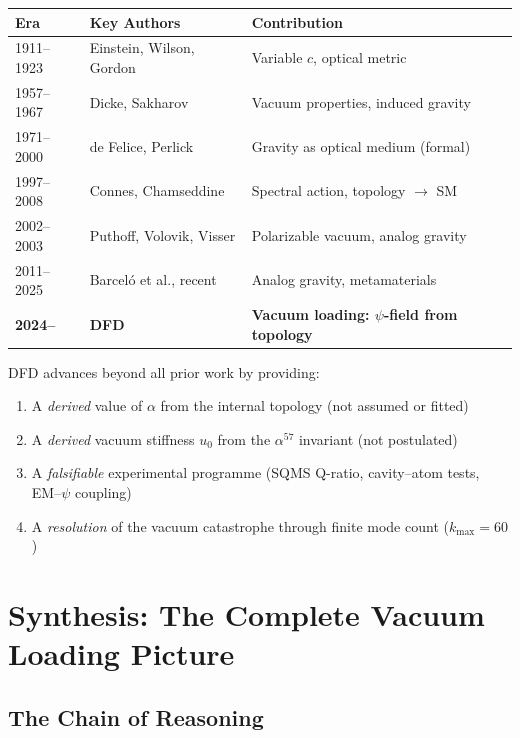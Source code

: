 \documentclass[11pt]{article}
\theoremstyle{plain}
\theoremstyle{definition}
\theoremstyle{remark}
\begin{document}
\begin{center}
\begin{tabular}{lll}
\toprule
\textbf{Era} & \textbf{Key Authors} & \textbf{Contribution} \\
\midrule
1911--1923 & Einstein, Wilson, Gordon & Variable $c$, optical metric \\
1957--1967 & Dicke, Sakharov & Vacuum properties, induced gravity \\
1971--2000 & de Felice, Perlick & Gravity as optical medium (formal) \\
1997--2008 & Connes, Chamseddine & Spectral action, topology $\to$ SM \\
2002--2003 & Puthoff, Volovik, Visser & Polarizable vacuum, analog gravity \\
2011--2025 & Barcel\'{o} et al., recent & Analog gravity, metamaterials \\
\textbf{2024--} & \textbf{DFD} & \textbf{Vacuum loading: $\psi$-field from topology} \\
\bottomrule
\end{tabular}
\end{center}

DFD advances beyond all prior work by providing:
\begin{enumerate}
\item A \emph{derived} value of $\alpha$ from the internal topology
(not assumed or fitted)
\item A \emph{derived} vacuum stiffness $u_0$ from the $\alpha^{57}$
invariant (not postulated)
\item A \emph{falsifiable} experimental programme (SQMS Q-ratio,
cavity--atom tests, EM--$\psi$ coupling)
\item A \emph{resolution} of the vacuum catastrophe through finite
mode count ($k_{\max} = 60$)
\end{enumerate}


\section{Synthesis: The Complete Vacuum Loading Picture}
\label{sec:synthesis}

\subsection{The Chain of Reasoning}
\end{document}
